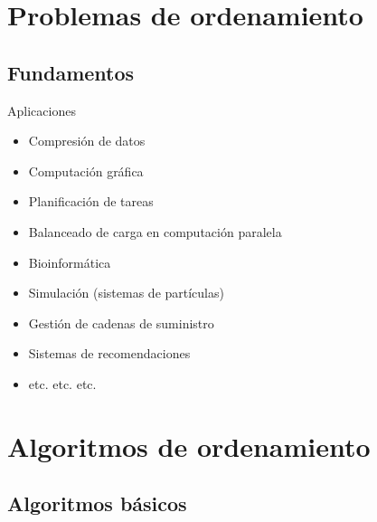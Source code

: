 \documentclass{beamer} %
\begin{document}

\section{Problemas de ordenamiento}

\subsection{Fundamentos}



\begin{frame}{Aplicaciones}
    \begin{itemize}
        \item Compresión de datos
        \item Computación gráfica
        \item Planificación de tareas
        \item Balanceado de carga en computación paralela
        \item Bioinformática
        \item Simulación (sistemas de partículas)
        \item Gestión de cadenas de suministro
        \item Sistemas de recomendaciones
        \item etc. etc. etc.
    \end{itemize}
\end{frame}

\section{Algoritmos de ordenamiento}

\subsection{Algoritmos básicos}
\end{document}
